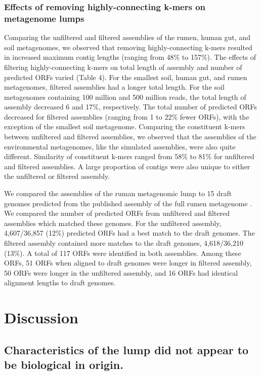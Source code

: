 \documentclass[11pt]{article} %
\begin{document}
\subsubsection{Effects of removing highly-connecting k-mers on metagenome lumps}
Comparing the unfiltered and filtered assemblies of the rumen, human gut, and soil metagenomes, we observed that removing highly-connecting k-mers resulted in increased maximum contig lengths (ranging from 48\% to 157\%).   The effects of filtering highly-connecting k-mers on total length of assembly and number of predicted ORFs varied (Table 4).   For the smallest soil, human gut, and rumen metagenomes, filtered assemblies had a longer total length.  For the soil metagenomes containing 100 million and 500 million reads, the total length of assembly decreased 6 and 17\%, respectively.  The total number of predicted ORFs decreased for filtered assemblies (ranging from 1 to 22\% fewer ORFs), with the exception of the smallest soil metagenome.  Comparing the constituent k-mers between unfiltered and filtered assemblies, we observed that the assemblies of the environmental metagenomes, like the simulated assemblies, were also quite different.  Similarity of constituent k-mers ranged from 58\% to 81\% for unfiltered and filtered assemblies.   A large proportion of contigs were also unique to either the unfiltered or filtered assembly.

We compared the assemblies of the ruman metagenomic lump to 15 draft genomes predicted from the published assembly of the full rumen metagenome \cite{Hess:2011p686}.  We compared the number of predicted ORFs from unfiltered and filtered assemblies which matched these genomes.  For the unfiltered assembly, 4,607/36,857 (12\%) predicted ORFs had a best match to the draft genomes.  The filtered assembly contained more matches to the draft genomes, 4,618/36,210 (13\%).  A total of 117 ORFs were identified in both assemblies.  Among these ORFs, 51 ORFs when aligned to draft genomes were longer in filtered assembly, 50 ORFs were longer in the unfiltered assembly, and 16 ORFs had identical alignment lengths to draft genomes.  

\section{Discussion}

\subsection{Characteristics of the lump did not appear to be biological in origin.}
\end{document}
